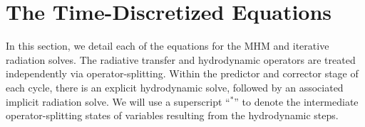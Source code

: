 \documentclass[preprint,12pt]{elsarticle}
\newcommand{\half}{\frac{1}{2}}
\newcommand{\fourth}{\frac{1}{4}}
\begin{document}
%
%
%
%
%
%
%

\section{The Time-Discretized Equations}\label{sec:full}

In this section, we detail each of the equations for the MHM and iterative radiation
solves.  The radiative transfer and hydrodynamic operators are treated independently via
operator-splitting.  Within the predictor and corrector stage of each cycle, there is an explicit hydrodynamic solve, followed by an associated implicit radiation solve. 
We will use a superscript ``$^*$'' to denote the intermediate operator-splitting states of variables resulting
from the hydrodynamic steps. 
\end{document}
